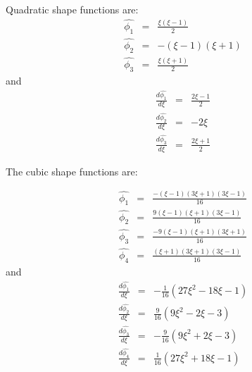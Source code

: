 \documentclass[paper=a4, fontsize=11pt]{article} %
\begin{document}
Quadratic shape functions are:
\begin{eqnarray}
\hat{\phi_1} &=& \frac{\xi(\xi-1)}{2} \nonumber\\
\hat{\phi_2} &=& -(\xi-1)(\xi+1)\nonumber\\
\hat{\phi_3} &=& \frac{\xi(\xi+1)} {2}
\end{eqnarray}
and 
\begin{eqnarray}
\frac{d\hat{\phi_1}}{d\xi} &=& \frac{2\xi-1}{2} \nonumber\\
\frac{d\hat{\phi_2}}{d\xi} &=& -2\xi \nonumber\\
\frac{d\hat{\phi_3}}{d\xi} &=& \frac{2\xi+1}{2}
\end{eqnarray}

The cubic shape functions are:

\begin{eqnarray}
\hat{\phi_1} &=& \frac{-(\xi-1)(3\xi+1)(3\xi-1)}{16} \nonumber\\
\hat{\phi_2} &=& \frac{9(\xi-1)(\xi+1)(3\xi-1)}{16} \nonumber\\
\hat{\phi_3} &=& \frac{-9(\xi-1)(\xi+1)(3\xi+1)}{16} \nonumber\\
\hat{\phi_4} &=& \frac{(\xi+1)(3\xi+1)(3\xi-1)}{16}
\end{eqnarray}
and
\begin{eqnarray}
\frac{d\hat{\phi_1}}{d\xi} &=& -\frac{1}{16} (27\xi^2 - 18\xi -1) \nonumber\\
\frac{d\hat{\phi_2}}{d\xi} &=& \frac{9}{16} (9\xi^2 -2\xi -3) \nonumber\\
\frac{d\hat{\phi_3}}{d\xi} &=& -\frac{9}{16} (9\xi^2 + 2\xi -3) \nonumber\\
\frac{d\hat{\phi_4}}{d\xi} &=& \frac{1}{16} (27\xi^2 + 18\xi-1)      
\end{eqnarray}
\end{document}
